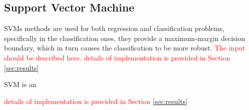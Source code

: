 \documentclass[8pt,conference,compsocconf]{IEEEtran}
\begin{document}
\subsection{Support Vector Machine}
SVMs methods are used for both regression and classification problems, specifically in the classification ones, they provide a maximum-margin decision boundary, which in turn causes the classification to be more robust. \textcolor{red}{The input should be described here. details of implementation is provided in Section \ref{sec:results}}



SVM is an 

\textcolor{red}{details of implementation is provided in Section \ref{sec:results}}
\end{document}
